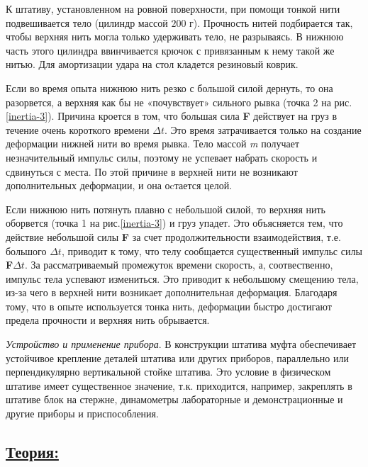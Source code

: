 \documentclass[14pt,a4paper,oneside]{extarticle}	%
\begin{document}
К штативу, установленном на ровной поверхности, при помощи тонкой нити подвешивается тело (цилиндр массой $ 200 $ г).
Прочность нитей подбирается так, чтобы верхняя нить могла только удерживать тело, не разрываясь.
В нижнюю часть этого цилиндра ввинчивается крючок с привязанным к нему такой же нитью.
Для амортизации удара на стол кладется резиновый коврик.

Если во время опыта нижнюю нить резко с большой силой дернуть, то она разорвется, а верхняя как бы не «почувствует» сильного рывка (точка 2 на рис.\ref{inertia-3}). 
Причина кроется в том, что большая сила \textbf{F} действует на груз в течение очень короткого времени $ \Delta t $. 
Это время затрачивается только на создание деформации нижней нити во время рывка. 
Тело массой \textit{m} получает незначительный импульс силы, поэтому не успевает набрать скорость и сдвинуться с места.
По этой причине в верхней нити не возникают дополнительных деформации, и она оcтается целой. 

Если нижнюю нить потянуть плавно с небольшой силой, то верхняя нить оборвется (точка 1 на рис.\ref{inertia-3}) и груз упадет.
Это объясняется тем, что действие небольшой силы \textbf{F} за счет продолжительности взаимодействия, т.е. большого $ \Delta t $, приводит к тому, что телу сообщается существенный импульс силы \textbf{F}$ \Delta t $.
За рассматриваемый промежуток времени скорость, а, соотвественно, импульс тела успевают измениться. 
Это приводит к небольшому смещению тела, из-за чего в верхней нити возникает дополнительная деформация.
Благодаря тому, что в опыте используется тонка нить, деформации быстро достигают предела прочности и верхняя нить обрывается. 

\textit{Устройство и применение прибора}. В конструкции штатива муфта обеспечивает устойчивое крепление деталей штатива или других приборов, параллельно или перпендикулярно вертикальной стойке штатива.
Это условие в физическом штативе имеет существенное значение, т.к. приходится, например, закреплять в штативе блок на стержне, динамометры лабораторные и демонстрационные и другие приборы и приспособления.


\newpage
\subsection*{\underline{Теория:}}
\end{document}
